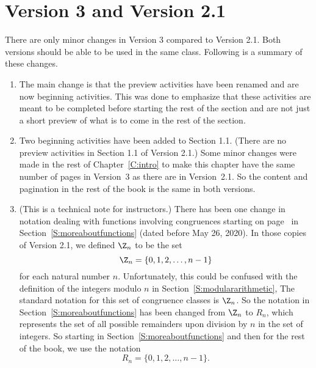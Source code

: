 
\chapter{Version 3 and Version 2.1} \label{C:versions}
\markboth{}{}
There are only minor changes in Version 3 compared to Version 2.1.  Both versions should be able to be used in the same class.  Following is a summary of these changes.
\begin{enumerate}
  \item The main change is that the preview activities have been renamed and are now beginning activities.  This was done to emphasize that these activities are meant to be completed before starting the rest of the section and are not just a short preview of what is to come in the rest of the section.
  \item Two beginning activities have been added to Section 1.1.  (There are no preview activities in Section 1.1 of Version 2.1.)  Some minor changes were made in the rest of Chapter~\ref{C:intro} to make this chapter have the same number of pages in Version~3 as there are in Version~2.1.  So the content and pagination in the rest of the book is the same in both versions.
  \item (This is a technical note for instructors.)  There has been one change in notation dealing with functions involving congruences starting on page~\pageref{sub:functioncong} in Section~\ref{S:moreaboutfunctions} (dated before May 26, 2020).  In those copies of Version 2.1, we defined $\Z_n$ to be the set
\[
\Z_n = \{0, 1, 2, \ldots, n-1 \}
\]
for each natural number $n$.  Unfortunately, this could be confused with the definition of the integers modulo $n$ in Section~\ref{S:modulararithmetic},  The standard notation for this set of congruence classes is $\Z_n$.  So the notation in Section~\ref{S:moreaboutfunctions} has been changed from $\Z_n$ to $R_n$, which represents the set of all possible remainders upon division by $n$ in the set of integers.  So starting in Section~\ref{S:moreaboutfunctions} and then for the rest of the book, we use the notation
\[
R_n = \{0, 1, 2, \ldots, n-1 \}.
\]

\end{enumerate}



\endinput

